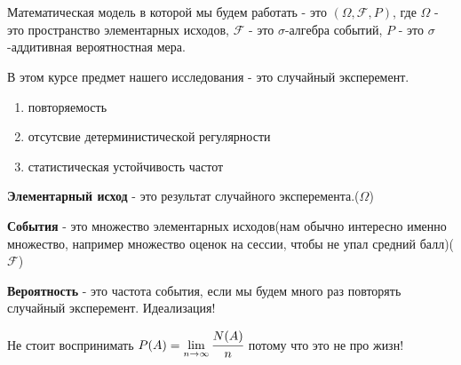 \section{}

Математическая модель в которой мы будем работать - это $(\Omega, \mathcal{F},
P)$, где $\Omega$ - это пространство элементарных исходов, $\mathcal{F}$ - это
$\sigma$-алгебра событий, $P$ - это $\sigma$-аддитивная вероятностная мера. 

В этом курсе предмет нашего исследования - это случайный эксперемент.
\begin{enumerate}
  \item повторяемость
  \item отсутсвие детерминистической регулярности
  \item статистическая устойчивость частот
\end{enumerate}

\textbf{ Элементарный исход} - это результат случайного эксперемента.($\Omega$)

\textbf{ События} - это множество элементарных исходов(нам обычно интересно именно множество,
например множество оценок на сессии, чтобы не упал средний
балл)($\mathcal{F}$)

\textbf{ Вероятность} - это частота события, если мы будем много
раз повторять случайный эксперемент. Идеализация!

Не стоит воспринимать $P(A) = \lim\limits_{n\to\infty } \cfrac{N(A)}{n} $ потому что это не про жизн!

